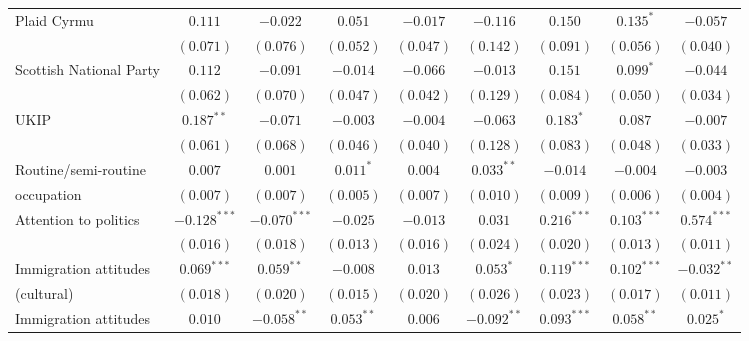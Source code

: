 \documentclass{article}
\begin{document}
\begin{table}
\begin{center}
{\begin{tabular}{l c c c c c c c c }
Plaid Cyrmu                      & $0.111$        & $-0.022$       & $0.051$        & $-0.017$       & $-0.116$       & $0.150$        & $0.135^{*}$    & $-0.057$       \\
                                 & $(0.071)$      & $(0.076)$      & $(0.052)$      & $(0.047)$      & $(0.142)$      & $(0.091)$      & $(0.056)$      & $(0.040)$      \\
Scottish National Party          & $0.112$        & $-0.091$       & $-0.014$       & $-0.066$       & $-0.013$       & $0.151$        & $0.099^{*}$    & $-0.044$       \\
                                 & $(0.062)$      & $(0.070)$      & $(0.047)$      & $(0.042)$      & $(0.129)$      & $(0.084)$      & $(0.050)$      & $(0.034)$      \\
UKIP                             & $0.187^{**}$   & $-0.071$       & $-0.003$       & $-0.004$       & $-0.063$       & $0.183^{*}$    & $0.087$        & $-0.007$       \\
                                 & $(0.061)$      & $(0.068)$      & $(0.046)$      & $(0.040)$      & $(0.128)$      & $(0.083)$      & $(0.048)$      & $(0.033)$      \\
Routine/semi-routine   & $0.007$        & $0.001$        & $0.011^{*}$    & $0.004$        & $0.033^{**}$   & $-0.014$       & $-0.004$       & $-0.003$       \\
 occupation                                & $(0.007)$      & $(0.007)$      & $(0.005)$      & $(0.007)$      & $(0.010)$      & $(0.009)$      & $(0.006)$      & $(0.004)$      \\
Attention to politics            & $-0.128^{***}$ & $-0.070^{***}$ & $-0.025$       & $-0.013$       & $0.031$        & $0.216^{***}$  & $0.103^{***}$  & $0.574^{***}$  \\
                                 & $(0.016)$      & $(0.018)$      & $(0.013)$      & $(0.016)$      & $(0.024)$      & $(0.020)$      & $(0.013)$      & $(0.011)$      \\
Immigration attitudes  & $0.069^{***}$  & $0.059^{**}$   & $-0.008$       & $0.013$        & $0.053^{*}$    & $0.119^{***}$  & $0.102^{***}$  & $-0.032^{**}$  \\
   (cultural)                              & $(0.018)$      & $(0.020)$      & $(0.015)$      & $(0.020)$      & $(0.026)$      & $(0.023)$      & $(0.017)$      & $(0.011)$      \\
Immigration attitudes  & $0.010$        & $-0.058^{**}$  & $0.053^{**}$   & $0.006$        & $-0.092^{**}$  & $0.093^{***}$  & $0.058^{**}$   & $0.025^{*}$    \\

\end{tabular}}
\end{center}
\end{table}
\end{document}
